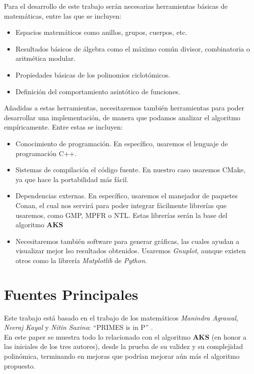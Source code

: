 Para el desarrollo de este trabajo serán necesarias herramientas básicas de matemáticas, entre las que se incluyen:

\begin{itemize}
	\item Espacios matemáticos como anillos, grupos, cuerpos, etc.
	
	\item Resultados básicos de álgebra como el máximo común divisor, combinatoria o aritmética modular.
	
	\item Propiedades básicas de los polinomios ciclotómicos.
	
	\item Definición del comportamiento asintótico de funciones.
\end{itemize}

Añadidas a estas herramientas, necesitaremos también herramientas para poder desarrollar una implementación, de manera que podamos analizar el algoritmo empíricamente. Entre estas se incluyen:

\begin{itemize}
	\item Conocimiento de programación. En específico, usaremos el lenguaje de programación C++.
	
	\item Sistemas de compilación el código fuente. En nuestro caso usaremos CMake, ya que hace la portabilidad más fácil.
	
	\item Dependencias externas. En específico, usaremos el manejador de paquetes Conan, el cual nos servirá para poder integrar fácilmente librerías que usaremos, como GMP, MPFR o NTL. Estas librerías serán la base del algoritmo \textbf{AKS}
	
	\item Necesitaremos también software para generar gráficas, las cuales ayudan a visualizar mejor lso resultados obtenidos. Usaremos \textit{Gnuplot}, aunque existen otros como la librería \textit{Matplotlib} de \textit{Python}.
\end{itemize}

\section{Fuentes Principales}

Este trabajo está basado en el trabajo de los matemáticos \textit{Manindra Agrawal}, \textit{Neeraj Kayal} y \textit{Nitin Saxina}: ``PRIMES is in P'' \cite{primes_is_in_p}.\\

En este paper se muestra todo lo relacionado con el algoritmo \textbf{AKS} (en honor a las iniciales de los tres autores), desde la prueba de su validez y su complejidad polinómica, terminando en mejoras que podrían mejorar aún más el algoritmo propuesto.

\endinput
